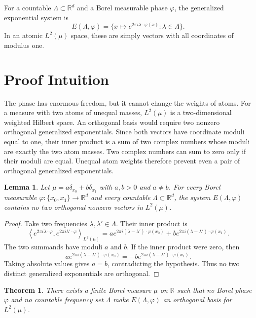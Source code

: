 \documentclass[11pt]{article}
\newtheorem{theorem}{Theorem}
\newtheorem{lemma}{Lemma}
\begin{document}
For a countable $\Lambda\subset\mathbb{R}^d$ and a Borel measurable phase
$\varphi$, the generalized exponential system is
\[
E(\Lambda,\varphi)=
\{x\mapsto e^{2\pi i\lambda\cdot\varphi(x)}:\lambda\in\Lambda\}.
\]
In an atomic $L^2(\mu)$ space, these are simply vectors with all coordinates
of modulus one.

\section{Proof Intuition}

The phase has enormous freedom, but it cannot change the weights of atoms.
For a measure with two atoms of unequal masses, $L^2(\mu)$ is a two-dimensional
weighted Hilbert space. An orthogonal basis would require two nonzero
orthogonal generalized exponentials. Since both vectors have coordinate
moduli equal to one, their inner product is a sum of two complex numbers whose
moduli are exactly the two atom masses. Two complex numbers can sum to zero
only if their moduli are equal. Unequal atom weights therefore prevent even a
pair of orthogonal generalized exponentials.

\begin{lemma}
Let $\mu=a\delta_{x_0}+b\delta_{x_1}$ with $a,b>0$ and $a\neq b$. For every
Borel measurable $\varphi:\{x_0,x_1\}\to\mathbb{R}^d$ and every countable
$\Lambda\subset\mathbb{R}^d$, the system $E(\Lambda,\varphi)$ contains no two
orthogonal nonzero vectors in $L^2(\mu)$.
\end{lemma}

\begin{proof}
Take two frequencies $\lambda,\lambda'\in\Lambda$. Their inner product is
\[
\left\langle e^{2\pi i\lambda\cdot\varphi},
e^{2\pi i\lambda'\cdot\varphi}\right\rangle_{L^2(\mu)}
=
a e^{2\pi i(\lambda-\lambda')\cdot\varphi(x_0)}
+b e^{2\pi i(\lambda-\lambda')\cdot\varphi(x_1)}.
\]
The two summands have moduli $a$ and $b$. If the inner product were zero, then
\[
a e^{2\pi i(\lambda-\lambda')\cdot\varphi(x_0)}
=
-b e^{2\pi i(\lambda-\lambda')\cdot\varphi(x_1)}.
\]
Taking absolute values gives $a=b$, contradicting the hypothesis. Thus no two
distinct generalized exponentials are orthogonal.
\end{proof}

\begin{theorem}
There exists a finite Borel measure $\mu$ on $\mathbb{R}$ such that no Borel
phase $\varphi$ and no countable frequency set $\Lambda$ make
$E(\Lambda,\varphi)$ an orthogonal basis for $L^2(\mu)$.
\end{theorem}
\end{document}
